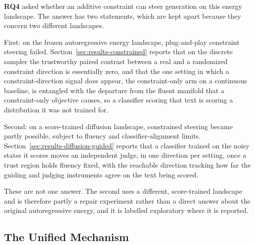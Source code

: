 \textbf{RQ4} asked whether an additive constraint can steer generation on this energy landscape. The answer has two statements, which are kept apart because they concern two different landscapes.

First: on the frozen autoregressive energy landscape, plug-and-play constraint steering failed. Section~\ref{sec:results-constrained} reports that on the discrete sampler the trustworthy paired contrast between a real and a randomized constraint direction is essentially zero, and that the one setting in which a constraint-direction signal does appear, the constraint-only arm on a continuous baseline, is entangled with the departure from the fluent manifold that a constraint-only objective causes, so a classifier scoring that text is scoring a distribution it was not trained for.

Second: on a score-trained diffusion landscape, constrained steering became partly possible, subject to fluency and classifier-alignment limits. Section~\ref{sec:results-diffusion-guided} reports that a classifier trained on the noisy states it scores moves an independent judge, in one direction per setting, once a trust region holds fluency fixed, with the reachable direction tracking how far the guiding and judging instruments agree on the text being scored.

These are not one answer. The second uses a different, score-trained landscape and is therefore partly a repair experiment rather than a direct answer about the original autoregressive energy, and it is labelled exploratory where it is reported.

\subsection{The Unified Mechanism}
\label{sec:disc-unified}

